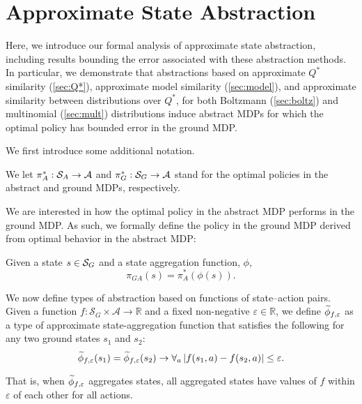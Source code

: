\section{Approximate State Abstraction}

\label{sec:theory_results}
Here, we introduce our formal analysis of approximate state abstraction, including results bounding the error associated with these abstraction methods. In particular, we demonstrate that abstractions based on approximate $Q^*$ similarity (\ref{sec:Q*}), approximate model similarity (\ref{sec:model}), and approximate similarity between distributions over $Q^*$, for both Boltzmann (\ref{sec:boltz}) and multinomial (\ref{sec:mult}) distributions induce abstract \acp{MDP} for which the optimal policy has bounded error in the ground MDP.

We first introduce some additional notation.

We let $\pi_A^* : \mathcal{S}_A \rightarrow \mathcal{A}$ and $\pi_G^* : \mathcal{S}_G \rightarrow \mathcal{A}$ stand for the optimal policies in the abstract and ground \acp{MDP}, respectively.
\edefn

We are interested in how the optimal policy in the abstract \ac{MDP} performs in the ground \ac{MDP}. As such, we formally define the policy in the ground \ac{MDP} derived from optimal behavior in the abstract \ac{MDP}:

Given a state $s \in \mathcal{S}_G$ and a state aggregation function, $\phi$, 
\begin{equation}
\pi_{GA}(s)=\pi_A^*(\phi(s)).
\end{equation}
\edefn

We now define types of abstraction based on functions of state--action pairs.
Given a function $f: \mathcal{S}_G \times \mathcal{A} \rightarrow \mathbb{R}$ and a fixed non-negative $\varepsilon \in \mathbb{R}$, we define $\widetilde \phi_{f,\varepsilon}$ as a type of approximate state-aggregation function that satisfies the following for any two ground states $s_1$ and $s_2$: 
\begin{equation}
\label{eq:phi_f}
\widetilde \phi_{f,\varepsilon}(s_1) = \widetilde \phi_{f,\varepsilon}(s_2) \rightarrow \forall_a \left|f(s_1, a) - f(s_2, a)\right| \leq \varepsilon.
\end{equation}
\edefn

That is, when $\widetilde \phi_{f,\varepsilon}$ aggregates states, all aggregated states have values of $f$ within $\varepsilon$ of each other for all actions.

